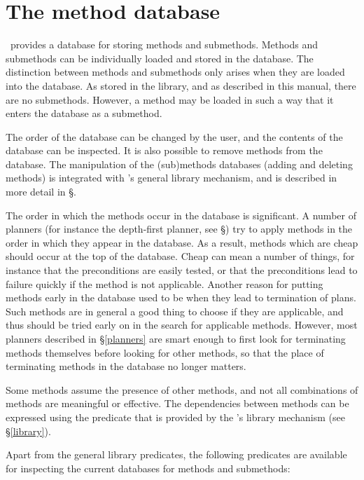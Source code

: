 
 
\section {The method database}
 \clam\ provides a database for storing methods
and submethods.  Methods and submethods can be individually loaded and
stored in the database.  The distinction between methods and
submethods only arises when they are loaded into the database.  As
stored in the library, and as described in this manual, there are no
submethods.  However, a method may be loaded in such a way that it
enters the database as a submethod.

The order of the database can be changed by the user,
and the contents of the database can be inspected. It is also possible
to remove methods from the database. The manipulation of the
(sub)methods databases (adding and deleting methods) is integrated 
with {\clam}'s general library mechanism, and is described in more
detail in \S{}.   

The order in which the methods occur in the database is significant. A
number of planners (for instance the depth-first planner, see
\S{}) try to apply methods in the order
in which they appear in the database. As a result, methods which are
cheap should occur at the top of the database. Cheap can mean a number
of things, for instance that the preconditions are easily tested, or
that the preconditions lead to failure quickly if the method is not
applicable. Another reason for putting methods early in the database
used to be when they lead to termination of plans. Such methods are in
general a good thing to choose if they are applicable, and thus should
be tried early on in the search for applicable methods. However, most
planners described in \S\ref{planners} are smart enough to first
look for terminating methods themselves before looking for other
methods, so that the place of terminating methods in the database no
longer matters.

Some methods assume the presence of other methods, and not all
combinations of methods are meaningful or effective. The dependencies
between methods can be expressed using the  predicate that
is provided by the {\clam}'s library mechanism (see \S\ref{library}). 

Apart from the general library predicates, the following predicates
are available for inspecting the current
databases for methods and submethods:

